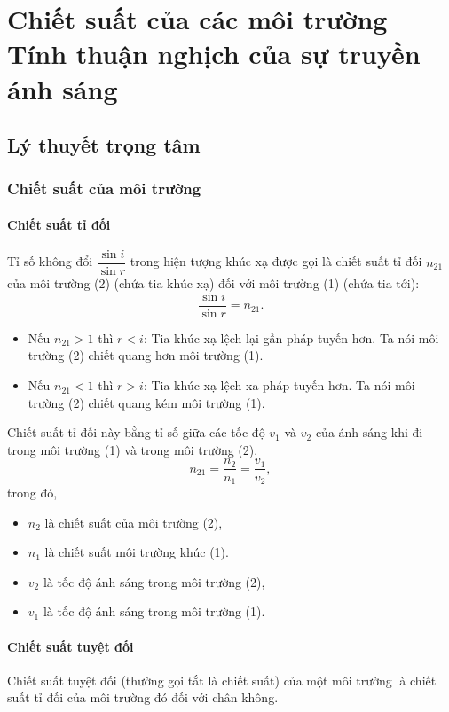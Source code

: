 \chapter[Chiết suất của các môi trường - Tính thuận nghịch của sự truyền ánh sáng]{Chiết suất của các môi trường \\Tính thuận nghịch của sự truyền ánh sáng}
\section{Lý thuyết trọng tâm}
\subsection{Chiết suất của môi trường}
\subsubsection{Chiết suất tỉ đối}
Tỉ số không đổi $\dfrac{\sin i}{\sin r}$ trong hiện tượng khúc xạ được gọi là chiết suất tỉ đối $n_{21}$ của môi trường (2) (chứa tia khúc xạ) đối với môi trường (1) (chứa tia tới):  
\begin{equation}
\dfrac{\sin i}{\sin r}=n_{21}.
\end{equation}

\begin{itemize}
	\item Nếu $n_{21}>1$ thì $r<i$: Tia khúc xạ lệch lại gần pháp tuyến hơn. Ta nói môi trường (2) chiết quang hơn môi trường (1).
	\item Nếu $n_{21}<1$ thì $r>i$: Tia khúc xạ lệch xa pháp tuyến hơn. Ta nói môi trường (2) chiết quang kém môi trường (1).
\end{itemize}
Chiết suất tỉ đối này bằng tỉ số giữa các tốc độ $v_1$ và $v_2$ của ánh sáng khi đi trong môi trường (1) và trong môi trường (2).
\begin{equation}
n_{21}=\dfrac{n_2}{n_1}=\dfrac{v_1}{v_2},
\end{equation}
trong đó,
\begin{itemize}
	\item $n_2$ là chiết suất của môi trường (2),
	\item $n_1$ là chiết suất môi trường khúc (1). 
	\item $v_2$ là tốc độ ánh sáng trong môi trường (2),
	\item $v_1$ là tốc độ ánh sáng trong môi trường (1).
\end{itemize}
\subsubsection{Chiết suất tuyệt đối}
Chiết suất tuyệt đối (thường gọi tắt là chiết suất) của một môi trường là chiết suất tỉ đối của môi trường đó đối với chân không.


